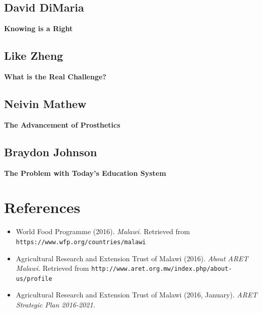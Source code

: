 \documentclass[12pt,letterpaper]{article}
\begin{document}
\clearpage
\subsection{David DiMaria}
\textbf{Knowing is a Right}

\clearpage
\subsection{Like Zheng}
\textbf{What is the Real Challenge?}\par


\clearpage
\subsection{Neivin Mathew}
\textbf{The Advancement of Prosthetics}\par

\clearpage
\subsection{Braydon Johnson}
\textbf{The Problem with Today's Education System}\par


\clearpage
\section{References}
\begin{flushleft}
\begin{itemize}[leftmargin=12pt]

\item World Food Programme (2016). \emph{Malawi.}
 Retrieved from \texttt{https://www.wfp.org/countries/malawi}

\item Agricultural Research and Extension Trust of Malawi (2016). \emph{About ARET Malawi.}
Retrieved from \texttt{http://www.aret.org.mw/index.php/about-us/profile}

\item Agricultural Research and Extension Trust of Malawi (2016, January). \emph{ARET Strategic Plan 2016-2021.}


\end{itemize}
\end{flushleft}   
\end{document}
